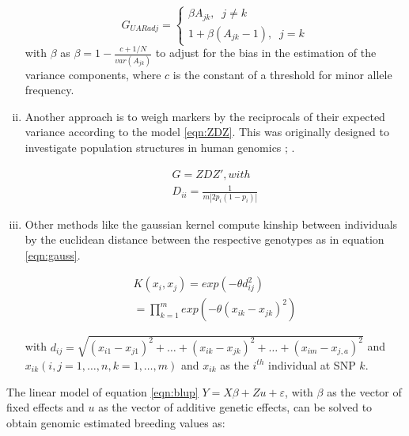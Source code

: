 \begin{enumerate}[(i)]
\begin{equation}
 G_{UARadj} = \left\{
  \!\begin{aligned}
   \beta A_{jk}, \;\; j \ne k \\
   1 + \beta (A_{jk}-1 ), \;\; j = k   
  \end{aligned}
  \right.
 \label{eqn:uaradj}
\end{equation}
with $\beta$ as $\beta = 1 - \frac{c + 1/N}{var(A_{jk})}$ to adjust for the bias in the
estimation of the variance components, where $c$ is the constant of a threshold for minor
allele frequency.


\item Another approach is to weigh markers by the reciprocals of their expected variance
  according to the model \ref{eqn:ZDZ}. This was originally designed to investigate
  population structures in human genomics \cite{leutenegger2003estimation};
  \cite{amin2007genomic}.

\begin{equation}
 \!\begin{aligned}
  G = ZDZ' , with \\
  D_{ii} = \frac{1}{m | 2p_i(1-p_i) | }
 \end{aligned}
 \label{eqn:ZDZ}
\end{equation}

\item Other methods like the gaussian kernel compute kinship between individuals by the euclidean distance
between the respective genotypes \cite{morota2014kernel} as in equation \ref{eqn:gauss}.

\begin{equation}
 \!\begin{aligned}
  K(x_i,x_j) = exp (- \theta d_{ij}^2) \\
  = \prod_{k=1}^m exp (- \theta(x_{ik} - x_{jk})^2)
 \end{aligned}
 \label{eqn:gauss}
\end{equation}

with
$d_{ij} = \sqrt{(x_{i1} - x_{j1})^2 + \dots + (x_{ik} - x_{jk})^2 + \dots + (x_{im} - x_{j,a})^2 }$
and
$ x_{ik}(i,j = 1, \dots , n,k = 1, \dots , m)$ and $x_{ik}$ as the $i^{th}$ individual at SNP $k$. \\
\end{enumerate}

The linear model of equation \ref{eqn:blup} $Y = X \beta + Zu + \varepsilon$, with $\beta$
as the vector of fixed effects and $u$ as the vector of additive genetic effects, can be
solved to obtain genomic estimated breeding values as:

